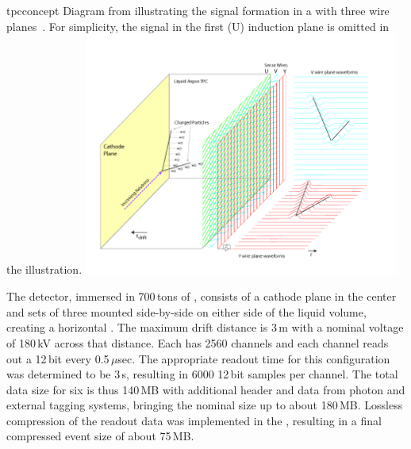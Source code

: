 \documentclass[../main-v1.tex]{subfiles}
\begin{document}
\begin{dunefigure}
{tpcconcept} %
{Diagram  from    illustrating the signal formation in a  with three wire planes~\cite{Acciarri:2016smi}. For simplicity, the signal in the first (U) induction plane is omitted in the illustration. }
\includegraphics[trim={0cm 0.6cm 2.5cm 0.7cm},clip,height=8cm]{graphics/IntroFigures/Fig_04_LArTPC_Concept.png}
\end{dunefigure}

The  detector, immersed in 700\,tons of , consists of %
a cathode plane in the center and sets of three  mounted side-by-side on %
either side of the liquid volume, creating a horizontal \efield. %
The maximum drift distance is  3\,m with  a nominal voltage of 180\,kV  across that distance.  Each  has 2560 channels and each channel reads out a 12\,bit  every 0.5\,$\mu$sec. %
The appropriate readout time for this configuration was determined to be 3\,s, resulting in 6000 12\,bit samples per channel. 
The total data size for six  is thus 140\,MB with additional header and data from photon and external tagging systems, bringing the nominal  size up to about 180\,MB.  Lossless compression of the  readout data was implemented in the , resulting in a final compressed event size of about 75\,MB. 
\end{document}
